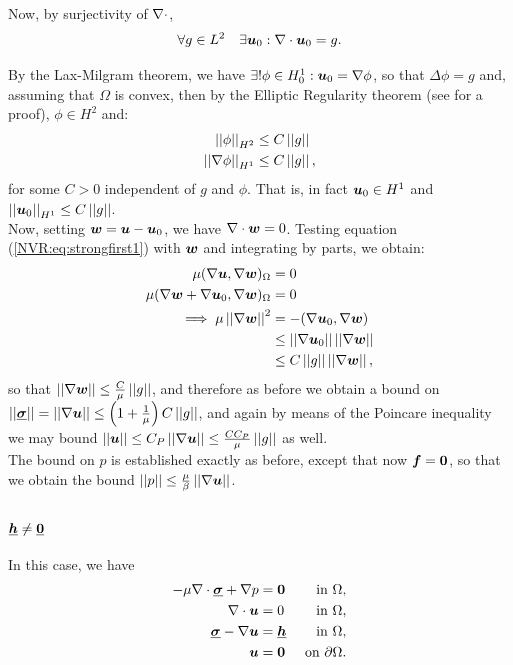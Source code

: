 Now, by surjectivity of $\NVRdiv$, 
\begin{align*}
\forall g \in L^{2} \quad \exists \vect{u}_{0} : \NVRdiv \vect{u}_{0} = g.
\end{align*}

By the Lax-Milgram theorem, we have $\exists ! \phi \in H^{1}_{0} : \vect{u}_{0} = \NVRgrad \phi$, so that $\Delta \phi = g$ and, assuming that $\Omega$ is convex, then by the Elliptic Regularity theorem (see \cite[p. 214]{Folland} for a proof), $\phi \in H^{2}$ and:
\begin{align*}
\norm{\phi}_{H^{2}} &\leq C \norm{g}\\ %
\norm{\NVRgrad \phi}_{H^{1}} &\leq C \norm{g},
\end{align*}
for some $C > 0$ independent of $g$ and $\phi$.  That is, in fact $\vect{u}_{0} \in H^{1}$ and $\norm{ \vect{u}_{0} }_{H^{1}} \leq C \norm{g}$. \\

Now, setting $\vect{w} = \vect{u} - \vect{u}_{0}$, we have $\NVRdiv \vect{w} = 0$.  Testing equation (\ref{NVR:eq:strongfirst1}) with $\vect{w}$ and integrating by parts, we obtain:
\begin{align*}
\mu (\NVRgrad \vect{u},\NVRgrad \vect{w})_{\Omega} &= 0\\
\mu (\NVRgrad \vect{w} + \NVRgrad \vect{u}_{0},\NVRgrad \vect{w})_{\Omega} &= 0\\
\implies \mu \norm{\NVRgrad \vect{w}}^{2} &= -(\NVRgrad \vect{u}_{0}, \NVRgrad \vect{w}) \\
&\leq \norm{ \NVRgrad \vect{u}_{0} } \norm{ \NVRgrad \vect{w} } \\
&\leq C \norm{g} \norm{ \NVRgrad \vect{w} },
\end{align*}
so that $\norm{ \NVRgrad \vect{w} } \leq  \frac{C}{\mu} \norm{ g }$, and therefore as before we obtain a bound on $\norm{\NVRtensor{\sigma}} = \norm{\NVRgrad \vect{u}} \leq \left( 1 + \frac{1}{\mu} \right) C \norm{g}$, and again by means of the Poincare inequality we may bound $\norm{\vect{u}} \leq C_{P} \norm{\NVRgrad \vect{u}} \leq \frac{C C_{P}}{\mu} \norm{ g }$ as well.\\

The bound on $p$ is established exactly as before, except that now $\vect{f} = \vect{0}$, so that we obtain the bound $\norm{p} \leq \frac{\mu}{\beta} \norm{\NVRgrad \vect{u}}$.


\subsubsection{$ \NVRtensor{h} \neq \NVRtensor{0}$}  In this case, we have
\begin{align}
- \mu \NVRdiv \NVRtensor{\sigma} + \NVRgrad p &= \vect{0} & \text{ in } \Omega, \label{NVR:eq:hstrongfirst} \\
\NVRdiv \vect{u} &= 0 & \text{ in } \Omega, \\
\NVRtensor{\sigma} - \NVRgrad \vect{u} &= \NVRtensor{h} & \text{ in } \Omega, \\
\vect{u} &= \vect{0} & \text{ on } \partial\Omega.\label{NVR:eq:hstronglast}
\end{align}

